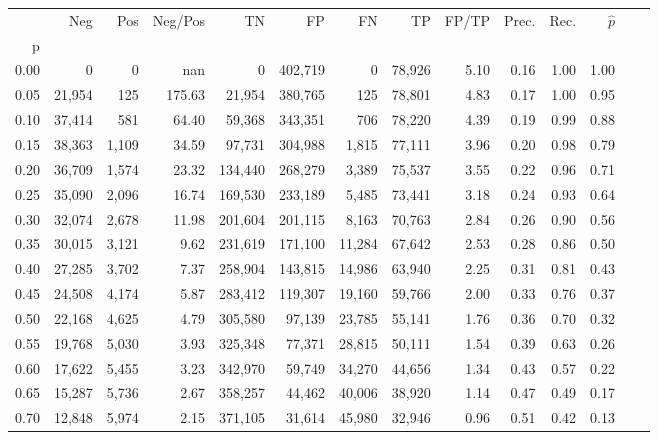 \begin{tabular}{rrrrrrrrrrrrrr}
\toprule
{} &     Neg &    Pos & Neg/Pos &       TN &       FP &      FN &      TP & FP/TP & Prec. &  Rec. & $\hat{p}$ \\
p    &         &        &         &          &          &         &         &       &       &       &           \\
\midrule
0.00 &       0 &      0 &     nan &        0 &  402,719 &       0 &  78,926 &  5.10 &  0.16 &  1.00 &      1.00 \\
0.05 &  21,954 &    125 &  175.63 &   21,954 &  380,765 &     125 &  78,801 &  4.83 &  0.17 &  1.00 &      0.95 \\
0.10 &  37,414 &    581 &   64.40 &   59,368 &  343,351 &     706 &  78,220 &  4.39 &  0.19 &  0.99 &      0.88 \\
0.15 &  38,363 &  1,109 &   34.59 &   97,731 &  304,988 &   1,815 &  77,111 &  3.96 &  0.20 &  0.98 &      0.79 \\
0.20 &  36,709 &  1,574 &   23.32 &  134,440 &  268,279 &   3,389 &  75,537 &  3.55 &  0.22 &  0.96 &      0.71 \\
0.25 &  35,090 &  2,096 &   16.74 &  169,530 &  233,189 &   5,485 &  73,441 &  3.18 &  0.24 &  0.93 &      0.64 \\
0.30 &  32,074 &  2,678 &   11.98 &  201,604 &  201,115 &   8,163 &  70,763 &  2.84 &  0.26 &  0.90 &      0.56 \\
0.35 &  30,015 &  3,121 &    9.62 &  231,619 &  171,100 &  11,284 &  67,642 &  2.53 &  0.28 &  0.86 &      0.50 \\
0.40 &  27,285 &  3,702 &    7.37 &  258,904 &  143,815 &  14,986 &  63,940 &  2.25 &  0.31 &  0.81 &      0.43 \\
0.45 &  24,508 &  4,174 &    5.87 &  283,412 &  119,307 &  19,160 &  59,766 &  2.00 &  0.33 &  0.76 &      0.37 \\
0.50 &  22,168 &  4,625 &    4.79 &  305,580 &   97,139 &  23,785 &  55,141 &  1.76 &  0.36 &  0.70 &      0.32 \\
0.55 &  19,768 &  5,030 &    3.93 &  325,348 &   77,371 &  28,815 &  50,111 &  1.54 &  0.39 &  0.63 &      0.26 \\
0.60 &  17,622 &  5,455 &    3.23 &  342,970 &   59,749 &  34,270 &  44,656 &  1.34 &  0.43 &  0.57 &      0.22 \\
0.65 &  15,287 &  5,736 &    2.67 &  358,257 &   44,462 &  40,006 &  38,920 &  1.14 &  0.47 &  0.49 &      0.17 \\
0.70 &  12,848 &  5,974 &    2.15 &  371,105 &   31,614 &  45,980 &  32,946 &  0.96 &  0.51 &  0.42 &      0.13 \\

\end{tabular}
